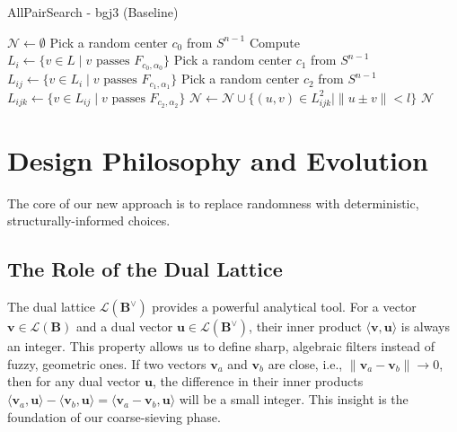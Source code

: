 \documentclass{article}
\begin{document}
\begin{algorithm}[H]
\caption{AllPairSearch - bgj3 (Baseline)} \label{alg:bgj3_report}
\begin{algorithmic}[1]
\State $\mathcal{N} \gets \emptyset$
    \State Pick a random center $c_0$ from $S^{n-1}$
    \State Compute $L_i \gets \{ v \in L \mid v \text{ passes } F_{c_0, \alpha_0} \}$
        \State Pick a random center $c_1$ from $S^{n-1}$
        \State $L_{ij} \gets \{ v \in L_i \mid v \text{ passes } F_{c_1, \alpha_1} \}$
            \State Pick a random center $c_2$ from $S^{n-1}$
            \State $L_{ijk} \gets \{ v \in L_{ij} \mid v \text{ passes } F_{c_2, \alpha_2} \}$
            \State $\mathcal{N} \gets \mathcal{N} \cup \{ (u, v) \in L_{ijk}^2 \mid \|u \pm v\| < l \}$
        \EndFor
    \EndFor
\EndFor
\State \Return $\mathcal{N}$
\end{algorithmic}
\end{algorithm}


\section{Design Philosophy and Evolution}

The core of our new approach is to replace randomness with deterministic, structurally-informed choices. 

\subsection{The Role of the Dual Lattice}
The dual lattice $\mathcal{L}(\mathbf{B}^{\vee})$ provides a powerful analytical tool. For a vector $\mathbf{v} \in \mathcal{L}(\mathbf{B})$ and a dual vector $\mathbf{u} \in \mathcal{L}(\mathbf{B}^{\vee})$, their inner product $\langle \mathbf{v}, \mathbf{u} \rangle$ is always an integer. This property allows us to define sharp, algebraic filters instead of fuzzy, geometric ones. If two vectors $\mathbf{v}_a$ and $\mathbf{v}_b$ are close, i.e., $\|\mathbf{v}_a - \mathbf{v}_b\| \to 0$, then for any dual vector $\mathbf{u}$, the difference in their inner products $\langle \mathbf{v}_a, \mathbf{u} \rangle - \langle \mathbf{v}_b, \mathbf{u} \rangle = \langle \mathbf{v}_a - \mathbf{v}_b, \mathbf{u} \rangle$ will be a small integer. This insight is the foundation of our coarse-sieving phase.
\end{document}

